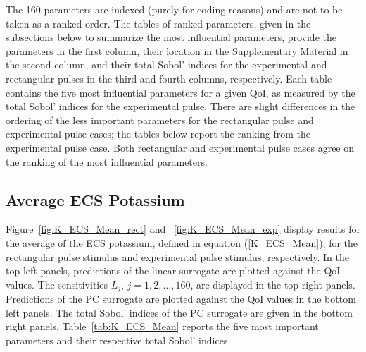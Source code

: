 The 160 parameters are indexed (purely for coding reasons) and are not to be taken as a ranked order. The tables of ranked parameters, given in the subsections below to summarize the most influential parameters, provide the parameters in the first column, their location in the Supplementary Material in the second column, and their total Sobol' indices for the experimental and rectangular pulses in the third and fourth columns, respectively. Each table contains the five most influential parameters for a given QoI, as measured by the total Sobol' indices for the experimental pulse. There are slight differences in the ordering of the less important parameters for the rectangular pulse and experimental pulse cases; the tables below report the ranking from the experimental pulse case. Both rectangular and experimental pulse cases agree on the ranking of the most influential parameters.

\subsection{Average ECS Potassium}
\label{sec:qoi_K_ECS_Mean}

Figure~\ref{fig:K_ECS_Mean_rect} and ~\ref{fig:K_ECS_Mean_exp} display results for the average of the ECS potassium, defined in equation (\ref{K_ECS_Mean}), for the rectangular pulse stimulus and experimental pulse stimulus, respectively. In the top left panels, predictions of the linear surrogate are plotted against the QoI values. The sensitivities $L_j$, $j=1,2,\dots,160$, are displayed in the top right panels. Predictions of the PC surrogate are plotted against the QoI values in the bottom left panels. The total Sobol' indices of the PC surrogate are given in the bottom right panels. Table~\ref{tab:K_ECS_Mean} reports the five most important parameters and their respective total Sobol' indices.

